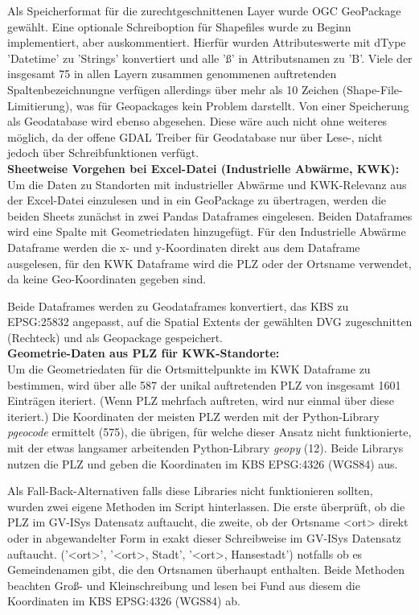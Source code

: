 			Als Speicherformat für die zurechtgeschnittenen Layer wurde OGC GeoPackage gewählt. Eine optionale Schreiboption für Shapefiles wurde zu Beginn implementiert, aber auskommentiert. Hierfür wurden Attributeswerte mit dType 'Datetime' zu 'Strings' konvertiert und alle 'ß' in Attributsnamen zu 'B'. Viele der insgesamt 75 in allen Layern zusammen genommenen auftretenden Spaltenbezeichnungne verfügen allerdings über mehr als 10 Zeichen (Shape-File-Limitierung), was für Geopackages kein Problem darstellt. Von einer Speicherung als Geodatabase wird ebenso abgesehen. Diese wäre auch nicht ohne weiteres möglich, da der offene GDAL Treiber für Geodatabase nur über Lese-, nicht jedoch über Schreibfunktionen verfügt. \\
			
			\textbf{Sheetweise Vorgehen bei Excel-Datei (Industrielle Abwärme, KWK):}\\
			Um die Daten zu Standorten mit industrieller Abwärme und KWK-Relevanz aus der Excel-Datei einzulesen und in ein GeoPackage zu übertragen, werden die beiden Sheets zunächst in zwei Pandas Dataframes eingelesen. Beiden Dataframes wird eine Spalte mit Geometriedaten hinzugefügt. Für den Industrielle Abwärme Dataframe werden die x- und y-Koordinaten direkt aus dem Dataframe ausgelesen, für den KWK Dataframe wird die PLZ oder der Ortsname verwendet, da keine Geo-Koordinaten gegeben sind.
			
			Beide Dataframes werden zu Geodataframes konvertiert, das KBS zu EPSG:25832 angepasst, auf die Spatial Extents der gewählten DVG zugeschnitten (Rechteck) und als Geopackage gespeichert.  \\
			
			\textbf{Geometrie-Daten aus PLZ für KWK-Standorte:}\\
			Um die Geometriedaten für die Ortsmittelpunkte im KWK Dataframe zu bestimmen, wird über alle 587 der unikal auftretenden PLZ von insgesamt 1601 Einträgen iteriert. (Wenn PLZ mehrfach auftreten, wird nur einmal über diese iteriert.) Die Koordinaten der meisten PLZ werden mit der Python-Library \textit{pgeocode} ermittelt (575), die übrigen, für welche dieser Ansatz nicht funktionierte, mit der etwas langsamer arbeitenden Python-Library \textit{geopy} (12). Beide Librarys nutzen die PLZ und geben die Koordinaten im KBS EPSG:4326 (WGS84) aus. 
			
			Als Fall-Back-Alternativen falls diese Libraries nicht funktionieren sollten, wurden zwei eigene Methoden im Script hinterlassen. Die erste überprüft, ob die PLZ im GV-ISys Datensatz auftaucht, die zweite, ob der Ortsname <ort> direkt oder in abgewandelter Form in exakt dieser Schreibweise im GV-ISys Datensatz auftaucht. ('<ort>', '<ort>, Stadt', '<ort>, Hansestadt') notfalls ob es Gemeindenamen gibt, die den Ortsnamen überhaupt enthalten. Beide Methoden beachten Groß- und Kleinschreibung und lesen bei Fund aus diesem die Koordinaten im KBS EPSG:4326 (WGS84) ab. 
			
